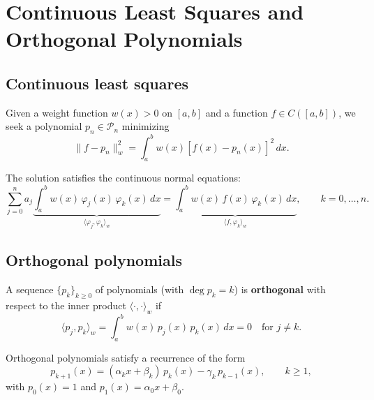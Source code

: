\section{Continuous Least Squares and Orthogonal Polynomials}

\subsection{Continuous least squares}

\begin{definition}
\label{def:continuous-ls}
Given a weight function $w(x) > 0$ on $[a,b]$ and a function $f \in C([a,b])$, we seek a polynomial $p_n \in \mathcal{P}_n$ minimizing
\[
    \|f - p_n\|_w^2 = \int_a^b w(x) \left[f(x) - p_n(x)\right]^2 \, dx.
\]
\end{definition}

The solution satisfies the continuous normal equations:
\[
    \sum_{j=0}^{n} a_j \underbrace{\int_a^b w(x)\,\varphi_j(x)\,\varphi_k(x)\,dx}_{\langle \varphi_j, \varphi_k \rangle_w} = \underbrace{\int_a^b w(x)\,f(x)\,\varphi_k(x)\,dx}_{\langle f, \varphi_k \rangle_w}, \qquad k = 0, \ldots, n.
\]

\subsection{Orthogonal polynomials}

\begin{definition}
\label{def:orthogonal-polynomials}
A sequence $\{p_k\}_{k \geq 0}$ of polynomials (with $\deg p_k = k$) is \textbf{orthogonal} with respect to the inner product $\langle \cdot, \cdot \rangle_w$ if
\[
    \langle p_j, p_k \rangle_w = \int_a^b w(x)\,p_j(x)\,p_k(x)\,dx = 0 \quad \text{for } j \neq k.
\]
\end{definition}

\begin{theorem}
\label{thm:three-term}
Orthogonal polynomials satisfy a recurrence of the form
\[
    p_{k+1}(x) = (\alpha_k x + \beta_k)\,p_k(x) - \gamma_k\,p_{k-1}(x), \qquad k \geq 1,
\]
with $p_0(x) = 1$ and $p_1(x) = \alpha_0 x + \beta_0$.
\end{theorem}

